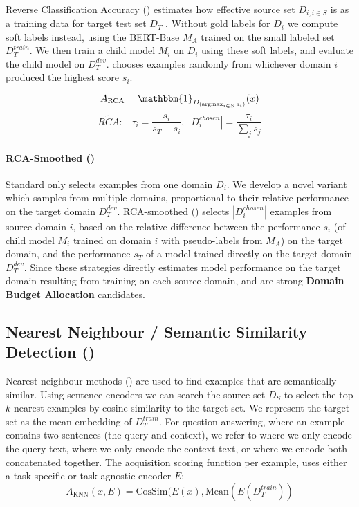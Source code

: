         \respace
        \paragraph{\rca}

        Reverse Classification Accuracy (\rca) estimates how effective source set $D_{i, i \in S}$ is as a training data for target test set $D_T$ \citep{fan2006reverse, elsahar-galle-2019-annotate}.
        Without gold labels for $D_{i}$ we compute soft labels instead, using the BERT-Base $M_A$ trained on the small labeled set $D_T^{train}$.
        We then train a child model $M_i$ on $D_{i}$ using these soft labels, and evaluate the child model on $D_T^{dev}$.
        \rca{} chooses examples randomly from whichever domain $i$ produced the highest score $s_i$.
        \respace
        \respace
        
        $$A_{\text{RCA}} = \mathbbm{1}_{D_{(\argmax_{i\in S}s_{i})}}(x) $$ 
        $$ \widetilde{RCA}:\;\;\; \tau_i = \dfrac{s_i}{s_T - s_i}, \; |D^{chosen}_i| = \dfrac{\tau_i}{\sum\limits_{j} s_j}$$

        \respace
        \respace
        \respace
        \paragraph{RCA-Smoothed (\rcas)}
        Standard \rca{} only selects examples from one domain $D_{i}$.
        We develop a novel variant which samples from multiple domains, proportional to their relative performance on the target domain $D_T^{dev}$.
        RCA-smoothed (\rcas) selects $|D^{chosen}_i|$ examples from source domain $i$, based on the relative difference between the performance $s_i$ (of child model $M_i$ trained on domain $i$ with pseudo-labels from $M_A$) on the target domain, and the performance $s_T$ of a model trained directly on the target domain $D_T^{dev}$. 
        Since these strategies directly estimates model performance on the target domain resulting from training on each source domain, \rca{} and \rcas{} are strong \textbf{Domain Budget Allocation} candidates.
        
    \respace
    \subsection{Nearest Neighbour / Semantic Similarity Detection (\knn)}
    \label{sec:kNN-method}
    \respace
    
    Nearest neighbour methods (\knn) are used to find examples that are semantically similar.
    Using sentence encoders we can search the source set $D_S$ to select the top $k$ nearest examples by cosine similarity to the target set.
    We represent the target set as the mean embedding of $D_T^{train}$. 
    For question answering, where an example contains two sentences (the query and context), we refer to \knnq{} where we only encode the query text, \knnc{} where we only encode the context text, or \knnqc{} where we encode both concatenated together.
    The acquisition scoring function per example, uses either a task-specific or task-agnostic encoder $E$:
    \respace
    $$A_{\text{KNN}}(x, E) = \text{CosSim}(E(x), \text{Mean}( E(D_{T}^{train} ))$$

